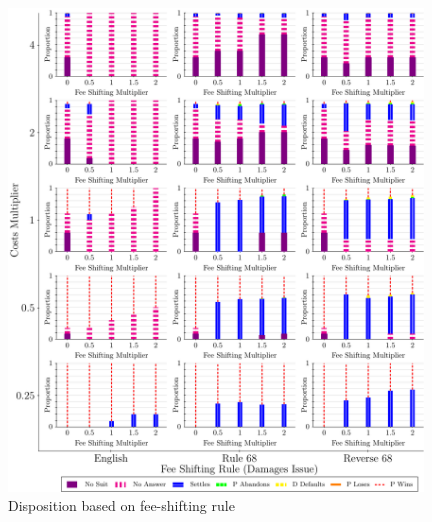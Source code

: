 \documentclass{article}
\begin{document}
\begin{figure}
    \centering
    \begin{minipage}{0.48\textwidth}
        \centering
        \includegraphics[width=0.98\textwidth, scale=0.70, trim={0in 0in 0in 0in}, clip]{../Figures/Disposition Varying Fee Shifting Rule (Damages Issue)} %
        \caption{Disposition based on fee-shifting rule}
		\label{fig:dispositions_damagesrule}
    \end{minipage}\hfill
    \begin{minipage}{0.48\textwidth}
        \centering

\end{minipage}
\end{figure}
\end{document}
